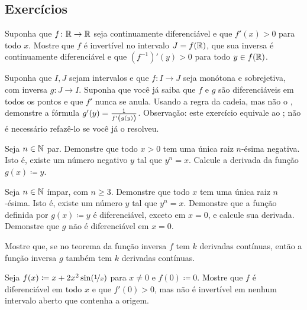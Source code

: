 \subsection{Exercícios}

\begin{exercise}
Suponha que $f \colon {\mathbb{R}} \to {\mathbb{R}}$ seja continuamente diferenciável e que $f'(x)>0$ para todo $x$. Mostre que $f$ é invertível no intervalo $J=f({\mathbb{R}})$, que sua inversa é continuamente diferenciável e que ${(f^{-1})'}(y)>0$ para todo $y \in f({\mathbb{R}})$.
\end{exercise}

\begin{exercise}
\pagebreak[2]
Suponha que $I,J$ sejam intervalos e que $f \colon I \to J$ seja monótona e sobrejetiva, com inversa $g \colon J \to I$. Suponha que você já saiba que $f$ e $g$ são diferenciáveis em todos os pontos e que $f'$ nunca se anula. Usando a regra da cadeia, mas não o , demonstre a fórmula $g'(y)=\frac{1}{f'\left(\vphantom{1_1^1}g(y)\right)}$. %
Observação: este exercício equivale ao ; não é necessário refazê-lo se você já o resolveu.
\end{exercise}

\begin{exercise}
\pagebreak[2]
Seja $n \in {\mathbb{N}}$ par. Demonstre que todo $x>0$ tem uma única raiz $n$-ésima negativa. Isto é, existe um número negativo $y$ tal que $y^n=x$. Calcule a derivada da função $g(x) \coloneqq y$.
\end{exercise}

\begin{exercise} \label{exercise:oddroot}
Seja $n \in {\mathbb{N}}$ ímpar, com $n \geq 3$. Demonstre que todo $x$ tem uma única raiz $n$-ésima. Isto é, existe um número $y$ tal que $y^n=x$. Demonstre que a função definida por $g(x) \coloneqq y$ é diferenciável, exceto em $x=0$, e calcule sua derivada. Demonstre que $g$ não é diferenciável em $x=0$.
\end{exercise}

\begin{exercise}
Mostre que, se no teorema da função inversa $f$ tem $k$ derivadas contínuas, então a função inversa $g$ também tem $k$ derivadas contínuas.
\end{exercise}

\begin{exercise}
Seja $f(x) \coloneqq x+2x^2\sin(\nicefrac{1}{x})$ para $x \neq 0$ e $f(0) \coloneqq 0$. Mostre que $f$ é diferenciável em todo $x$ e que $f'(0)>0$, mas não é invertível em nenhum intervalo aberto que contenha a origem.
\end{exercise}

